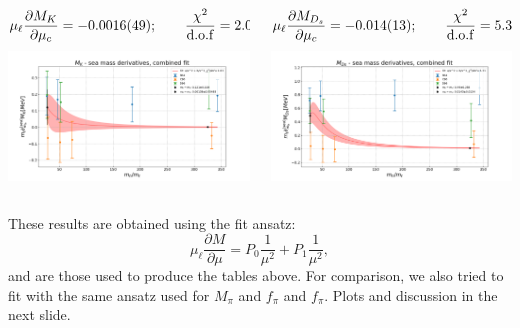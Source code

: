 \documentclass[xcolor={dvipsnames,table}]{beamer}
\begin{document}
\begin{frame}
   \begin{columns}
       \begin{column}{0.5\textwidth}
        {\small $$\mu_\ell \frac{\partial M_K}{\partial \mu_c} = -0.0016(49); \qquad\frac{\chi^2}{\rm d.o.f}= 2.0$$}
        \includegraphics[trim=0cm 0.5cm 0cm 1.3cm, clip,width=\textwidth]{plots/deco_fit_MK_der_mc.png}
       \end{column}
       \begin{column}{0.5\textwidth}
        {\small $$\mu_\ell \frac{\partial M_{D_s}}{\partial \mu_c} = -0.014(13); \qquad\frac{\chi^2}{\rm d.o.f}= 5.3$$}
        \includegraphics[trim=0cm 0.5cm 0cm 1.3cm, clip,width=\textwidth]{plots/deco_fit_MD_der_mc.png}
       \end{column}
   \end{columns}
   These results are obtained using the fit ansatz:
   \[
   \mu_\ell  \frac{\partial M }{\partial\mu} = P_0\frac{1}{\mu^2}+P_1\frac{1}{\mu^2},
   \]
   and are those used to produce the tables above. For comparison, we also tried to fit with the same ansatz used for $M_\pi$ and $f_\pi$ and $f_\pi$. Plots and discussion in the next slide.
\end{frame}
\end{document}
